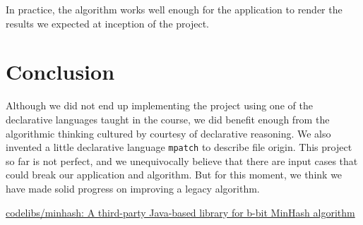 \documentclass{article}
\begin{document}
In practice, the algorithm works well enough for the application to render the results we expected at inception of the project. 

\section{Conclusion}
Although we did not end up implementing the project using one of the declarative languages taught in the course, we did benefit enough from the algorithmic thinking cultured by courtesy of declarative reasoning. We also invented a little declarative language \texttt{mpatch} to describe file origin. This project so far is not perfect, and we unequivocally believe that there are input cases that could break our application and algorithm. But for this moment, we think we have made solid progress on improving a legacy algorithm. 






\begin{thebibliography}{9}
      \href{https://github.com/codelibs/minhash}{codelibs/minhash: A third-party Java-based library  for b-bit MinHash algorithm}


\end{thebibliography} %
\end{document}
